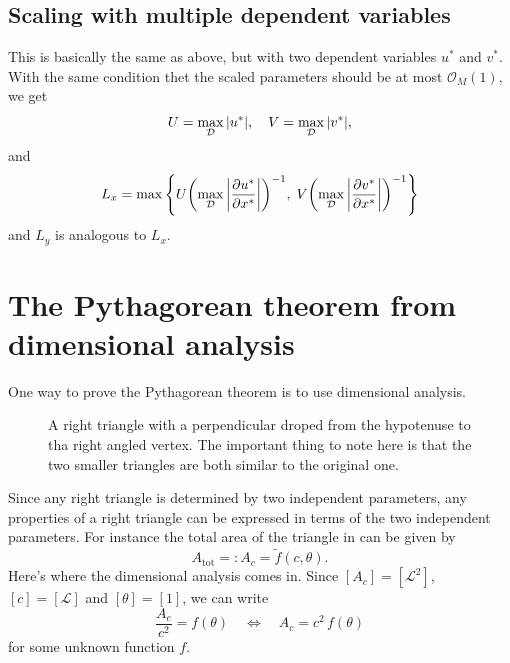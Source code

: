 \documentclass[11pt,letter, swedish, english
]{article}
\begin{document}
\subsection{Scaling with multiple dependent variables}
This is basically the same as above, but with two dependent variables
$u^*$ and $v^*$. With the same condition thet the scaled parameters
should be at most $\mathcal{O}_M(1)$, we get
\begin{equation}
U=\max_\mathcal{D}\abs{u^*} \qcomma
V=\max_\mathcal{D}\abs{v^*},
\end{equation}
and 
\begin{equation}
L_x=\max\qty{
U\qty(\max_\mathcal{D}\abs{\pdv{u^*}{x^*}})^{-1},\;
V\qty(\max_\mathcal{D}\abs{\pdv{v^*}{x^*}})^{-1}
}
\end{equation}
and $L_y$ is analogous to $L_x$.


\renewcommand{\thesubsection}{\arabic{section} (\alph{subsection})}
\renewcommand{\thesubsubsection}{\arabic{section} (\alph{subsection},\,\roman{subsubsection})}

\section{The Pythagorean theorem from dimensional analysis}
One way to prove the Pythagorean theorem is to use dimensional
analysis. 

\begin{figure}\centering
\resizebox{.5\textwidth}{!}{
}
\caption{A right triangle with a perpendicular droped from the
  hypotenuse to tha right angled vertex. The important thing to note
  here is that the two smaller triangles are both similar to the
  original one. }
\label{fig:triangle}
\end{figure}

Since any right triangle is determined by two independent
parameters, any properties of a right triangle can be expressed in
terms of the two independent parameters. For instance the total area
of the triangle in  can be given by
\begin{equation}
A_\text{tot}=:A_c=\tilde{f}(c, \theta).
\end{equation}
Here's where the dimensional analysis comes in. Since
$[A_c]=[\mathcal{L}^2]$, $[c]=[\mathcal{L}]$ and $[\theta]=[1]$, we
can write
\begin{equation}
\frac{A_c}{c^2}=f(\theta)
\quad\Longleftrightarrow\quad
A_c=c^2\,f(\theta)
\end{equation}
for some unknown function $f$. 
\end{document}
